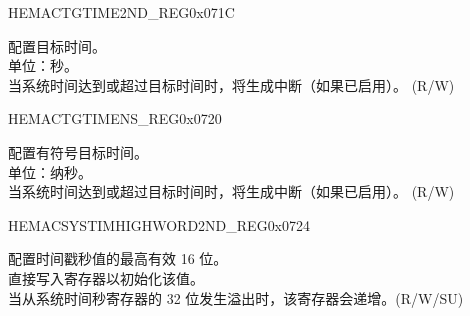 \begin{register}{H}{EMACTGTIME2ND\_REG}{0x071C}\label{regdesc:EMACTARGETTIMESECONDREG}
%
\regnewline%
\begin{regdesc}\begin{reglist}
\item [TSTR] 配置目标时间。\\
单位：秒。\\
当系统时间达到或超过目标时间时，将生成中断（如果已启用）。 (R/W)
\end{reglist}\end{regdesc}
\end{register}


\begin{register}{H}{EMACTGTIMENS\_REG}{0x0720}\label{regdesc:EMACTARGETTIMENANOSREG}
%
%
\regnewline%
\begin{regdesc}\begin{reglist}
\item [TTSLO] 配置有符号目标时间。\\
单位：纳秒。\\
当系统时间达到或超过目标时间时，将生成中断（如果已启用）。 (R/W)
\end{reglist}\end{regdesc}
\end{register}

\begin{register}{H}{EMACSYSTIMHIGHWORD2ND\_REG}{0x0724}\label{regdesc:EMACSYSTEMTIMEHIGHERWORDSECONDREG}
%
%
\regnewline%
\begin{regdesc}\begin{reglist}
\item [TSHWR] 配置时间戳秒值的最高有效 16 位。\\
直接写入寄存器以初始化该值。\\
当从系统时间秒寄存器的 32 位发生溢出时，该寄存器会递增。(R/W/SU)
\end{reglist}\end{regdesc}
\end{register}


